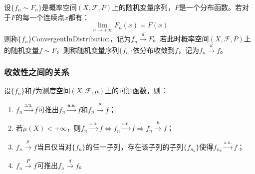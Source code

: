 \begin{definition}
	设$\{f_n\sim F_n\}$是概率空间$(X,\mathscr{F},P)$上的随机变量序列，$F$是一个分布函数。若对于$F$的每一个连续点$x$都有：
	\begin{equation*}
		\lim_{n\to+\infty}F_n(x)=F(x)
	\end{equation*}
	则称$\{f_n\}$\gls{ConvergentInDistribution}，记为$f_n\overset{d}{\longrightarrow}F$。若此时概率空间$(X,\mathscr{F},P)$上的随机变量$f\sim F$，则称随机变量序列$\{f_n\}$依分布收敛到$f$，记为$f_n\overset{d}{\longrightarrow}f$。
\end{definition}

\subsubsection{收敛性之间的关系}
\begin{theorem}\label{theo:a.e.a.u.mu.d}
	设$\{f_n\}$和$f$为测度空间$(X,\mathscr{F},\mu)$上的可测函数，则：
	\begin{enumerate}
		\item $f_n\overset{\text{a.u.}}{\longrightarrow}f$可推出$f_n\overset{\textbf{a.e.}}{\longrightarrow}f$和$f_n\overset{\mu}{\longrightarrow}f$；
		\item 若$\mu(X)<+\infty$，则$f_n\overset{\text{a.u.}}{\longrightarrow}f\iff f_n\overset{\text{a.e.}}{\longrightarrow}f\Rightarrow f_n\overset{\mu}{\longrightarrow}f$；
		\item $f_n\overset{\mu}{\longrightarrow}f$当且仅当对$\{f_n\}$的任一子列，存在该子列的子列$\{f_{n_k}\}$使得$f_{n_k}\overset{\text{a.u.}}{\longrightarrow}f$；
		\item $f_n\overset{P}{\longrightarrow}f$可推出$f_n\overset{d}{\longrightarrow}f$。
	\end{enumerate}
\end{theorem}
